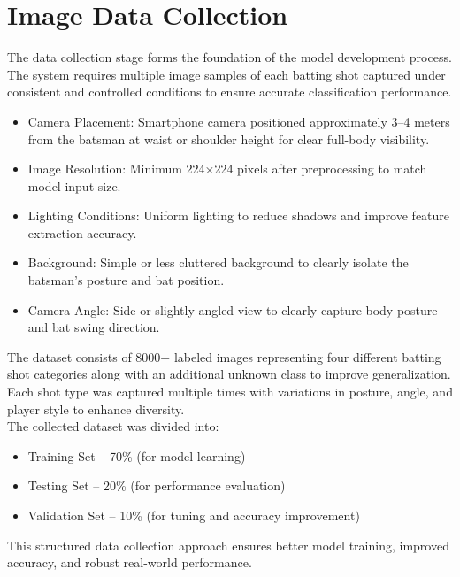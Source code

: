 \section{Image Data Collection} \label{S$.3}
The data collection stage forms the foundation of the model development process. The system requires multiple image samples of each batting shot captured under consistent and controlled conditions to ensure accurate classification performance.
\begin{itemize}
	\item Camera Placement: Smartphone camera positioned approximately 3–4 meters from the batsman at waist or shoulder height for clear full-body visibility.
	\item Image Resolution: Minimum 224×224 pixels after preprocessing to match model input size.
	\item Lighting Conditions: Uniform lighting to reduce shadows and improve feature extraction accuracy.
	\item Background: Simple or less cluttered background to clearly isolate the batsman’s posture and bat position.
	\item Camera Angle: Side or slightly angled view to clearly capture body posture and bat swing direction.
\end{itemize}

The dataset consists of 8000+ labeled images representing four different batting shot categories along with an additional unknown class to improve generalization. Each shot type was captured multiple times with variations in posture, angle, and player style to enhance diversity.\\
The collected dataset was divided into:
\begin{itemize}
	\item Training Set – 70\% (for model learning)
	\item Testing Set – 20\% (for performance evaluation)
	\item Validation Set – 10\% (for tuning and accuracy improvement)
\end{itemize}
This structured data collection approach ensures better model training, improved accuracy, and robust real-world performance.


